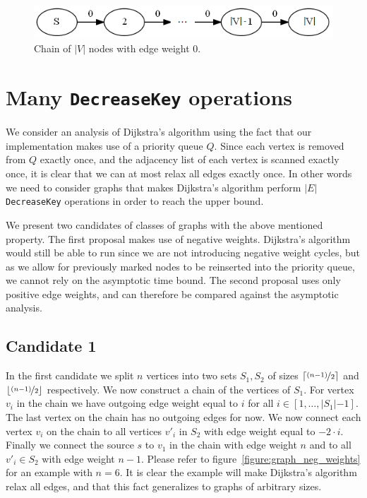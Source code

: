 \documentclass[a4paper,oneside,article,11pt]{memoir}
\begin{document}
\begin{figure}[H]
\centering
\centerline {
  \includegraphics[scale=1]{../figures/graph_chain.png}
}
\caption{Chain of $\vert V \vert$ nodes with edge weight 0.}
\label{figure:graph_chain}
\end{figure}

\section{Many \texttt{DecreaseKey} operations}
\label{sec:many_decreasekey}
We consider an analysis of Dijkstra's algorithm using the fact that our implementation makes use of a priority queue $Q$. Since each vertex is removed from $Q$ exactly once, and the adjacency list of each vertex is scanned exactly once, it is clear that we can at most relax all edges exactly once.
In other words we need to consider graphs that makes Dijkstra's algorithm perform $\vert E \vert$ \texttt{DecreaseKey} operations in order to reach the upper bound.

We present two candidates of classes of graphs with the above mentioned property. The first proposal makes use of negative weights. Dijkstra's algorithm would still be able to run since we are not introducing negative weight cycles, but as we allow for previously marked nodes to be reinserted into the priority queue, we cannot rely on the asymptotic time bound. The second proposal uses only positive edge weights, and can therefore be compared against the asymptotic analysis.

\subsection{Candidate 1}
In the first candidate we split $n$ vertices into two sets $S_1, S_2$ of sizes $\lceil \nicefrac{(n-1)}{2} \rceil$ and $\lfloor \nicefrac{(n-1)}{2} \rfloor$ respectively. We now construct a chain of the vertices of $S_1$. For vertex $v_i$ in the chain we have outgoing edge weight equal to $i$ for all $i \in [1, \dots ,\lvert S_1 \lvert - 1]$. The last vertex on the chain has no outgoing edges for now. We now connect each vertex $v_i$ on the chain to all vertices ${v'}_i$ in $S_2$ with edge weight equal to $-2 \cdot i$. Finally we connect the source $s$ to $v_1$ in the chain with edge weight $n$ and to all ${v'}_i \in S_2$ with edge weight $n-1$. Please refer to figure~\ref{figure:graph_neg_weights} for an example with $n=6$. It is clear the example will make Dijkstra's algorithm relax all edges, and that this fact generalizes to graphs of arbitrary sizes.
\end{document}
